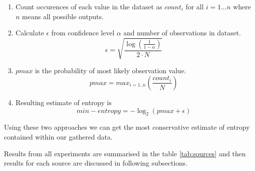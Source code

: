\documentclass[
  print, %
  Table,   %
  nolof,     %
  nolot,     %
           oneside
]{fithesis3}
\begin{document}
  \begin{enumerate}
    \item Count occurences of each value in the dataset as $count_i$ for all $i=1 \dots n$ where $n$ means all possible outputs.
    \item Calculate $\epsilon$ from confidence level $\alpha$ and number of observations in dataset.
    $$\epsilon = \sqrt{\frac{\log(\frac{1}{1-\alpha})}{2\cdot N}}$$
    \item $pmax$ is the probability of most likely observation value.
    $$pmax = max_{i=1..n}(\frac{count_i}{N})$$
    \item Resulting estimate of entropy is
    $$min-entropy =  -\log_2 (pmax + \epsilon)$$

  \end{enumerate}

  Using these two approaches we can get the most conservative estimate of entropy contained within our gathered data.

  Results from all experiments are summarised in the table \ref{tab:sources} and then results for each source are discussed in following subsections.
\end{document}
